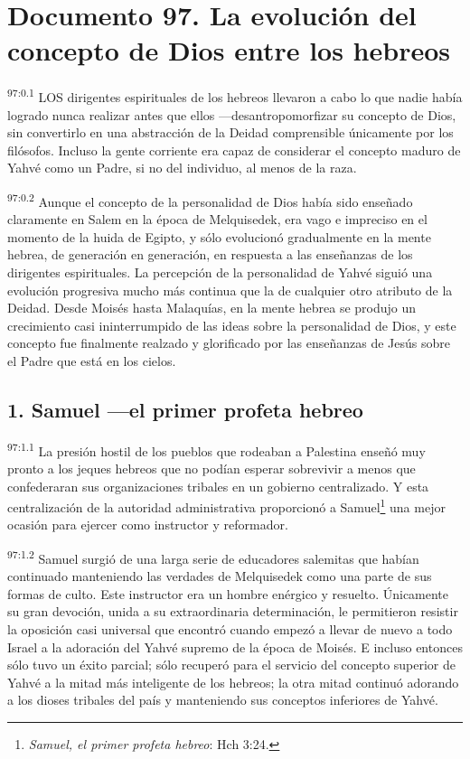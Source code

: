 \chapter{Documento 97. La evolución del concepto de Dios entre los hebreos}
\par
\textsuperscript{97:0.1} LOS dirigentes espirituales de los hebreos llevaron a cabo lo que nadie había logrado nunca realizar antes que ellos ---desantropomorfizar su concepto de Dios, sin convertirlo en una abstracción de la Deidad comprensible únicamente por los filósofos. Incluso la gente corriente era capaz de considerar el concepto maduro de Yahvé como un Padre, si no del individuo, al menos de la raza.

\par
\textsuperscript{97:0.2} Aunque el concepto de la personalidad de Dios había sido enseñado claramente en Salem en la época de Melquisedek, era vago e impreciso en el momento de la huida de Egipto, y sólo evolucionó gradualmente en la mente hebrea, de generación en generación, en respuesta a las enseñanzas de los dirigentes espirituales. La percepción de la personalidad de Yahvé siguió una evolución progresiva mucho más continua que la de cualquier otro atributo de la Deidad. Desde Moisés hasta Malaquías, en la mente hebrea se produjo un crecimiento casi ininterrumpido de las ideas sobre la personalidad de Dios, y este concepto fue finalmente realzado y glorificado por las enseñanzas de Jesús sobre el Padre que está en los cielos.

\section*{1. Samuel ---el primer profeta hebreo}
\par
\textsuperscript{97:1.1} La presión hostil de los pueblos que rodeaban a Palestina enseñó muy pronto a los jeques hebreos que no podían esperar sobrevivir a menos que confederaran sus organizaciones tribales en un gobierno centralizado. Y esta centralización de la autoridad administrativa proporcionó a Samuel\footnote{\textit{Samuel, el primer profeta hebreo}: Hch 3:24.} una mejor ocasión para ejercer como instructor y reformador.

\par
\textsuperscript{97:1.2} Samuel surgió de una larga serie de educadores salemitas que habían continuado manteniendo las verdades de Melquisedek como una parte de sus formas de culto. Este instructor era un hombre enérgico y resuelto. Únicamente su gran devoción, unida a su extraordinaria determinación, le permitieron resistir la oposición casi universal que encontró cuando empezó a llevar de nuevo a todo Israel a la adoración del Yahvé supremo de la época de Moisés. E incluso entonces sólo tuvo un éxito parcial; sólo recuperó para el servicio del concepto superior de Yahvé a la mitad más inteligente de los hebreos; la otra mitad continuó adorando a los dioses tribales del país y manteniendo sus conceptos inferiores de Yahvé.


